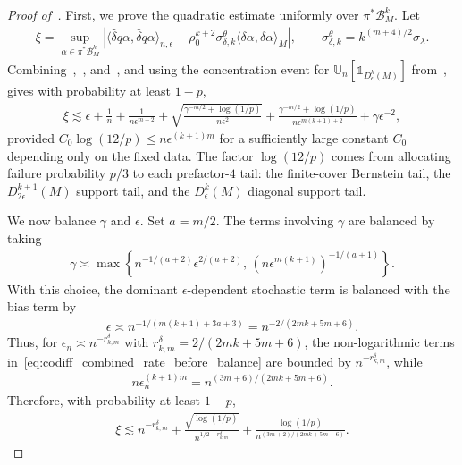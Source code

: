 \documentclass[11pt,reqno]{amsproc}
\numberwithin{equation}{section}
\newcommand{\U}{\mathbb{U}}
\newcommand{\one}{\mathbb{1}}
\newcommand{\cB}{\mathcal{B}}
\newcommand{\hdelta}{\hat{\delta}}
\newcommand{\ls}{\lesssim}
\theoremstyle{definition}
\theoremstyle{plain}
\begin{document}
\begin{proof}[Proof of~]
    First, we prove the quadratic estimate uniformly over $\pi^*\cB_M^k$. Let
    \begin{align}
        \xi=\sup_{\alpha\in\pi^*\cB_M^k}\left|\langle\hdelta q\alpha,\hdelta q\alpha\rangle_{n,\epsilon}-\rho_0^{k+2}\sigma^\theta_{\delta,k}\langle\delta\alpha,\delta\alpha\rangle_M\right|,
        \qquad \sigma^\theta_{\delta,k}=k^{(m+4)/2}\sigma_\lambda.
    \end{align}
    Combining~,~, and~, and using the concentration event for $\U_n[\one_{D^k_\epsilon(M)}]$ from~, gives with probability at least $1-p$,
    \begin{align} \label{eq:codiff_combined_rate_before_balance}
        \xi\ls \epsilon+\frac1n+\frac{1}{n\epsilon^{m+2}}
        +\sqrt{\frac{\gamma^{-m/2}+\log(1/p)}{n\epsilon^2}}
        +\frac{\gamma^{-m/2}+\log(1/p)}{n\epsilon^{m(k+1)+2}}
        +\gamma\epsilon^{-2},
    \end{align}
    provided $C_0\log(12/p)\leq n\epsilon^{(k+1)m}$ for a sufficiently large constant $C_0$ depending only on the fixed data.
    The factor $\log(12/p)$ comes from allocating failure probability $p/3$ to each prefactor-$4$ tail: the finite-cover Bernstein tail, the $D^{k+1}_{2\epsilon}(M)$ support tail, and the $D^k_\epsilon(M)$ diagonal support tail.

    We now balance $\gamma$ and $\epsilon$. Set $a=m/2$. The terms involving $\gamma$ are balanced by taking
    \begin{align}
        \gamma\asymp \max\left\{n^{-1/(a+2)}\epsilon^{2/(a+2)},\, (n\epsilon^{m(k+1)})^{-1/(a+1)}\right\}.
    \end{align}
    With this choice, the dominant $\epsilon$-dependent stochastic term is balanced with the bias term by
    \begin{align}
        \epsilon\asymp n^{-1/(m(k+1)+3a+3)}=n^{-2/(2mk+5m+6)}.
    \end{align}
    Thus, for $\epsilon_n\asymp n^{-r^\delta_{k,m}}$ with $r^\delta_{k,m}=2/(2mk+5m+6)$, the non-logarithmic terms in~\eqref{eq:codiff_combined_rate_before_balance} are bounded by $n^{-r^\delta_{k,m}}$, while
    \begin{align}
        n\epsilon_n^{(k+1)m}=n^{(3m+6)/(2mk+5m+6)}.
    \end{align}
    Therefore, with probability at least $1-p$,
    \begin{align}
        \xi\ls n^{-r^\delta_{k,m}}+\frac{\sqrt{\log(1/p)}}{n^{1/2-r^\delta_{k,m}}}+\frac{\log(1/p)}{n^{(3m+2)/(2mk+5m+6)}}.
    \end{align}


\end{proof}
\end{document}
